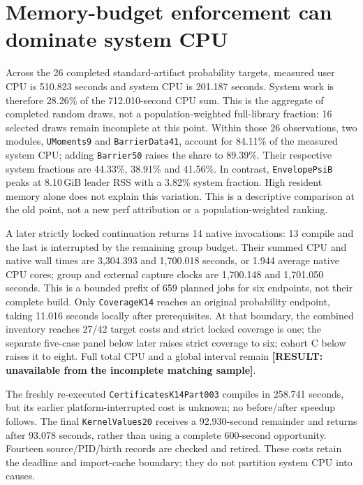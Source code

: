 \documentclass[10pt,twocolumn]{article}
\newcommand{\missing}[1]{\textbf{[RESULT: #1]}}
\begin{document}
\section{Memory-budget enforcement can dominate system CPU}
\label{sec:system}
Across the 26 completed standard-artifact probability targets, measured
user CPU is 510.823 seconds and system CPU is 201.187 seconds.
System work is therefore 28.26\% of the 712.010-second CPU sum.
This is the aggregate of completed random draws, not a population-weighted
full-library fraction: 16 selected draws remain incomplete at this point.
Within those 26 observations, two modules, \texttt{UMoments9} and
\texttt{BarrierData41}, account for 84.11\% of the measured system CPU;
adding \texttt{Barrier50} raises the share to 89.39\%.
Their respective system fractions are 44.33\%, 38.91\% and 41.56\%.
In contrast, \texttt{EnvelopePsiB} peaks at 8.10\,GiB leader RSS with a
3.82\% system fraction. High resident memory alone does not explain
this variation. This is a descriptive comparison at the old point, not a
new perf attribution or a population-weighted ranking.

A later strictly locked continuation returns 14 native invocations:
13 compile and the last is interrupted by the remaining group budget.
Their summed CPU and native wall times are 3,304.393 and 1,700.018 seconds,
or 1.944 average native CPU cores; group and external capture clocks are
1,700.148 and 1,701.050 seconds. This is a bounded prefix of 659 planned
jobs for six endpoints, not their complete build.
Only \texttt{CoverageK14} reaches an original probability endpoint,
taking 11.016 seconds locally after prerequisites.
At that boundary, the combined inventory reaches 27/42 target costs
and strict locked coverage is one; the separate five-case panel below
later raises strict coverage to six; cohort C below raises it to eight.
Full total CPU and a global interval remain
\missing{unavailable from the incomplete matching sample}.

The freshly re-executed \texttt{CertificatesK14Part003} compiles in
258.741 seconds, but its earlier platform-interrupted cost is unknown;
no before/after speedup follows.
The final \texttt{KernelValues20} receives a 92.930-second remainder and
returns after 93.078 seconds, rather than using a complete 600-second
opportunity. Fourteen source/PID/birth records are checked and retired.
These costs retain the deadline and import-cache boundary; they do not
partition system CPU into causes.
\end{document}
